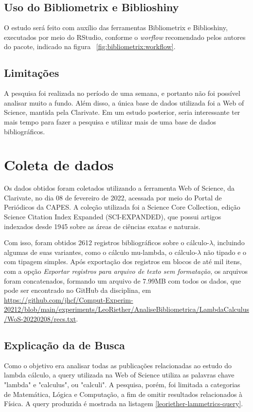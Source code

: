 \subsection{Uso do Bibliometrix e Biblioshiny}
O estudo será feito com auxílio das ferramentas Bibliometrix e Biblioshiny, executados por meio do RStudio, conforme o \textit{worflow} recomendado pelos autores do pacote, indicado na figura ~\ref{fig:bibliometrix:workflow}.

\subsection{Limitações}
A pesquisa foi realizada no período de uma semana, e portanto não foi possível analisar muito a fundo. Além disso, a única base de dados utilizada foi a Web of Science, mantida pela Clarivate. Em um estudo posterior, seria interessante ter mais tempo para fazer a pesquisa e utilizar mais de uma base de dados bibliográficos.


\section{Coleta de dados\label{leoriether:lammetrics:coleta}}
Os dados obtidos foram coletados utilizando a ferramenta Web of Science, da Clarivate, no dia 08 de fevereiro de 2022, acessada por meio do Portal de Periódicos da CAPES. A coleção utilizada foi a Science Core Collection, edição Science Citation Index Expanded (SCI-EXPANDED), que possui artigos indexados desde 1945 sobre as áreas de ciências exatas e naturais.



Com isso, foram obtidos 2612 registros bibliográficos sobre o cálculo-$\lambda$, incluindo algumas de suas variantes, como o cálculo mu-lambda, o cálculo-$\lambda$ não tipado e o com tipagem simples. Após exportação dos registros em blocos de até mil itens, com a opção \textit{Exportar registros para arquivo de texto sem formatação}, os arquivos foram concatenados, formando um arquivo de 7.99MB com todos os dados, que pode ser encontrado no GitHub da disciplina, em \url{https://github.com/jhcf/Comput-Experim-20212/blob/main/experiments/LeoRiether/AnaliseBibliometrica/LambdaCalculus/WoS-20220208/recs.txt}.

\subsection{Explicação da \query de Busca}
Como o objetivo era analisar todas as publicações relacionadas ao estudo do lambda cálculo, a query utilizada na Web of Science utiliza as palavras chave "lambda" e "calculus", ou "calculi". A pesquisa, porém, foi limitada a categorias de Matemática, Lógica e Computação, a fim de omitir resultados relacionados à Física. A query produzida é mostrada na listagem \ref{leoriether-lammetrics-query}.

